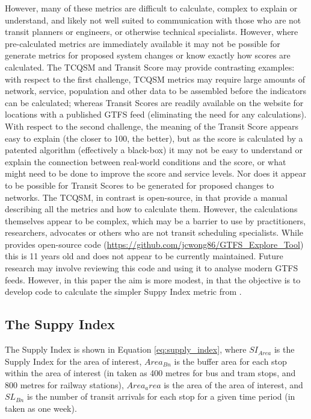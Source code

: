 \documentclass[numbered]{trbunofficial}
\begin{document}
However, many of these metrics are difficult to calculate, complex to
explain or understand, and likely not well suited to communication with
those who are not transit planners or engineers, or otherwise technical
specialists. However, where pre-calculated metrics are immediately
available it may not be possible for generate metrics for proposed
system changes or know exactly how scores are calculated. The TCQSM and
Transit Score may provide contrasting examples: with respect to the
first challenge, TCQSM metrics may require large amounts of network,
service, population and other data to be assembled before the indicators
can be calculated; whereas Transit Scores are readily available on the
\citet{WalkScore:2023tg} website for locations with a published GTFS
feed (eliminating the need for any calculations). With respect to the
second challenge, the meaning of the Transit Score appears easy to
explain (the closer to 100, the better), but as the score is calculated
by a patented algorithm (effectively a black-box) it may not be easy to
understand or explain the connection between real-world conditions and
the score, or what might need to be done to improve the score and
service levels. Nor does it appear to be possible for Transit Scores to
be generated for proposed changes to networks. The TCQSM, in contrast is
open-source, in that \citet{TCQSM:2013} provide a manual describing all
the metrics and how to calculate them. However, the calculations
themselves appear to be complex, which may be a barrier to use by
practitioners, researchers, advocates or others who are not transit
scheduling specialists. While \citet{Wong:2013aa} provides open-source
code (\url{https://github.com/jcwong86/GTFS_Explore_Tool}) this is 11
years old and does not appear to be currently maintained. Future
research may involve reviewing this code and using it to analyse modern
GTFS feeds. However, in this paper the aim is more modest, in that the
objective is to develop code to calculate the simpler Suppy Index metric
from \citet{currie2007identifying}.

\hypertarget{the-suppy-index}{%
\subsection{The Suppy Index}\label{the-suppy-index}}

The Supply Index is shown in Equation \ref{eq:supply_index}, where
\(SI_{Area}\) is the Supply Index for the area of interest,
\(Area_{Bn}\) is the buffer area for each stop within the area of
interest (in \citet{currie2007identifying} taken as 400 metres for bus
and tram stops, and 800 metres for railway stations), \(Area_area\) is
the area of the area of interest, and \(SL_{Bn}\) is the number of
transit arrivals for each stop for a given time period (in
\citet{currie2007identifying} taken as one week).
\end{document}
